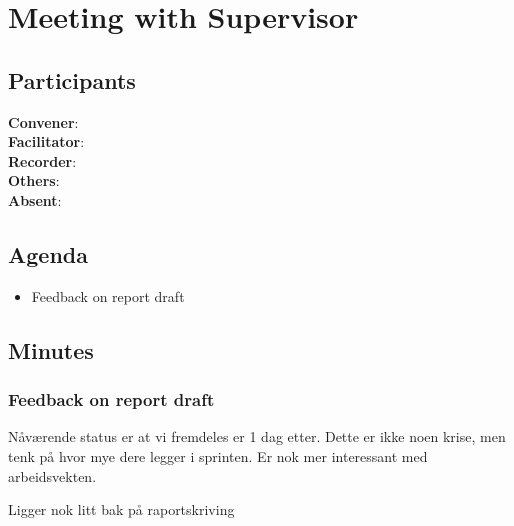 \section*{Meeting with Supervisor}

\subsection*{Participants}

\textbf{Convener}: \supervisor{}\\
\textbf{Facilitator}: \facilitator{}  \\
\textbf{Recorder}: \scrummaster{}  \\
\textbf{Others}:\groupleader{}    \\
\textbf{Absent}: 

\subsection*{Agenda}
\begin{itemize}
    \item Feedback on report draft

\end{itemize}

\subsection*{Minutes}

\subsubsection*{Feedback on report draft}
Nåværende status er at vi fremdeles er 1 dag etter. Dette er ikke noen krise, men tenk på hvor mye dere legger i sprinten. Er nok mer interessant med arbeidsvekten. 

Ligger nok litt bak på raportskriving

\newpage